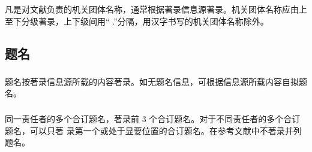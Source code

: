 \documentclass[twoside]{article}%
\begin{document}
\begin{refsection}
\nocite{帛画2023给出佚名,anon1981-628givenanon}

{\printbibliography[heading=none,env=exampleenv]}
\end{refsection}

\subsubsection{}\label{sec:author:group} 凡是对文献负责的机关团体名称，通常根据著录信息源著录。机关团体名称应由上至下分级著录，上下级间用“ .”分隔，用汉字书写的机关团体名称除外。

\begin{refsection}
\nocite{中国科学院物理研究所--}
\nocite{贵州省土穰普查办公室--}
\nocite{AmericanChemicalSociety--}
\nocite{StanfordUniversity--}

{}
\end{refsection}

\subsection{题名}

\subsubsection{} 题名按著录信息源所载的内容著录。如无题名信息，可根据信息源所载内容自拟题名。
\begin{refsection}
\nocite{西游记词汇--}
\nocite{张子正蒙注--}
\nocite{化学动力学和反应器原理--}
\nocite{袖珍神学--}
\nocite{北京师范大学学报--}
\nocite{Gasesinsea--}
\nocite{jmath--}


{}
\end{refsection}

\subsubsection{} 同一责任者的多个合订题名，著录前 3 个合订题名。对于不同责任者的多个合订题名，可以只著
录第一个或处于显要位置的合订题名。在参考文献中不著录并列题名。

\begin{refsection}
\nocite{为人民服务--}
\nocite{大趋势--}

{}
\end{refsection}
\end{document}
